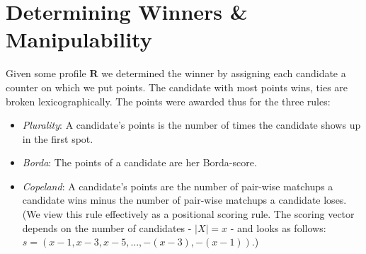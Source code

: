 \documentclass[10pt,a4paper]{article}
\begin{document}
\section{Determining Winners \& Manipulability}
Given some profile $\mathbf{R}$ we determined the winner by assigning each candidate a counter on which we put points. The candidate with most points wins, ties are broken lexicographically. The points were awarded thus for the three rules:
\begin{itemize}
\item \textit{Plurality}: A candidate's points is the number of times the candidate shows up in the first spot.
\item \textit{Borda}: The points of a candidate are her Borda-score.
\item \textit{Copeland}: A candidate's points are the number of pair-wise matchups a candidate wins minus the number of pair-wise matchups a candidate loses. (We view this rule effectively as a positional scoring rule. The scoring vector depends on the number of candidates - $|X|=x$ - and looks as follows: $s=(x-1, x-3, x-5, ..., -(x-3), -(x-1))$.)
\end{itemize}
\end{document}
